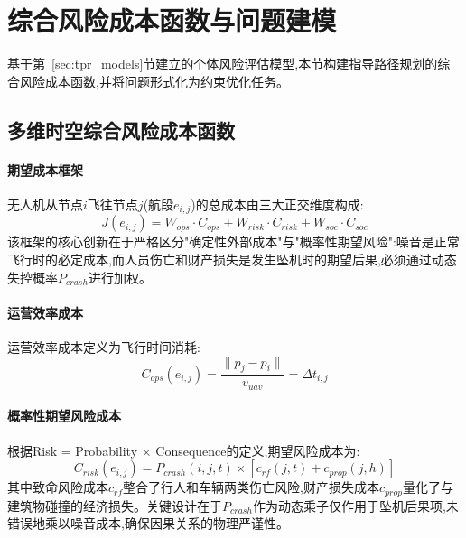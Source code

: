 
\section{综合风险成本函数与问题建模}
\label{sec:problem_formulation}

基于第~\ref{sec:tpr_models}节建立的个体风险评估模型,本节构建指导路径规划的综合风险成本函数,并将问题形式化为约束优化任务。

\subsection{多维时空综合风险成本函数}

\paragraph{期望成本框架}

无人机从节点$i$飞往节点$j$(航段$e_{i,j}$)的总成本由三大正交维度构成:
\begin{equation}
J(e_{i,j}) = W_{ops} \cdot C_{ops} + W_{risk} \cdot C_{risk} + W_{soc} \cdot C_{soc}
\label{eq:total_cost_framework}
\end{equation}
该框架的核心创新在于严格区分"确定性外部成本"与"概率性期望风险":噪音是正常飞行时的必定成本,而人员伤亡和财产损失是发生坠机时的期望后果,必须通过动态失控概率$P_{crash}$进行加权。

\paragraph{运营效率成本}

运营效率成本定义为飞行时间消耗:
\begin{equation}
C_{ops}(e_{i,j}) = \frac{\| p_j - p_i \|}{v_{uav}} = \Delta t_{i,j}
\label{eq:operational_cost}
\end{equation}

\paragraph{概率性期望风险成本}

根据Risk = Probability $\times$ Consequence的定义,期望风险成本为:
\begin{equation}
C_{risk}(e_{i,j}) = P_{crash}(i, j, t) \times \left[ c_{rf}(j, t) + c_{prop}(j, h) \right]
\label{eq:risk_cost}
\end{equation}
其中致命风险成本$c_{rf}$整合了行人和车辆两类伤亡风险,财产损失成本$c_{prop}$量化了与建筑物碰撞的经济损失。关键设计在于$P_{crash}$作为动态乘子仅作用于坠机后果项,未错误地乘以噪音成本,确保因果关系的物理严谨性。

